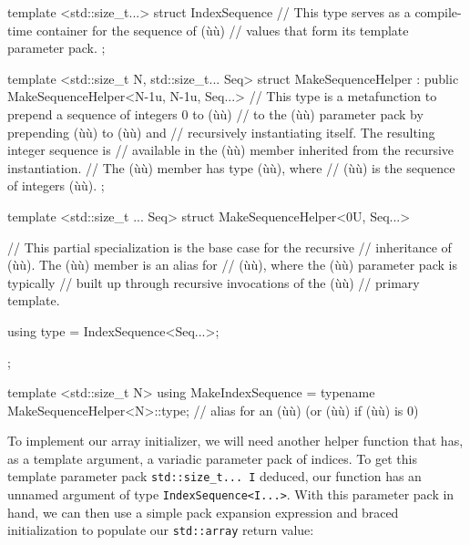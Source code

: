 \begin{emcppslisting}[emcppsbatch=e14]
template <std::size_t...>
struct IndexSequence
{
    // This type serves as a compile-time container for the sequence of (ù{}ù)
    // values that form its template parameter pack.
};

template <std::size_t N, std::size_t... Seq>
struct MakeSequenceHelper : public MakeSequenceHelper<N-1u, N-1u, Seq...>
{
    // This type is a metafunction to prepend a sequence of integers 0 to (ù{}ù)
    // to the (ù{}ù) parameter pack by prepending (ù{}ù) to (ù{}ù) and
    // recursively instantiating itself.  The resulting integer sequence is
    // available in the (ù{}ù) member inherited from the recursive instantiation.
    // The (ù{}ù) member has type (ù{}ù), where
    // (ù{}ù) is the sequence of integers (ù{}ù).
};

template <std::size_t ... Seq>
struct MakeSequenceHelper<0U, Seq...>
{
    // This partial specialization is the base case for the recursive
    // inheritance of (ù{}ù).  The (ù{}ù) member is an alias for
    // (ù{}ù), where the (ù{}ù) parameter pack is typically
    // built up through recursive invocations of the (ù{}ù)
    // primary template.

    using type = IndexSequence<Seq...>;
};

template <std::size_t N>
using MakeIndexSequence = typename MakeSequenceHelper<N>::type;
    // alias for an (ù{}ù) (or (ù{}ù) if (ù{}ù) is 0)
\end{emcppslisting}
    

\noindent To implement our array initializer, we will need another helper function
that has, as a template argument, a variadic parameter pack of indices.
To get this template parameter pack \lstinline!std::size_t...!~\lstinline!I!
deduced, our function has an unnamed argument of type
\lstinline!IndexSequence<I...>!. With this parameter pack in hand, we can
then use a simple pack expansion expression and braced initialization to
populate our \lstinline!std::array! return value:

